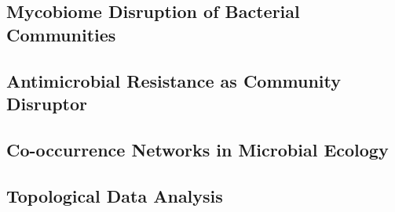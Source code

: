 \subsection{Mycobiome Disruption of Bacterial Communities}
\label{subsec:mycobiome}

\subsection{Antimicrobial Resistance as Community Disruptor}
\label{subsec:amr}

\subsection{Co-occurrence Networks in Microbial Ecology}
\label{subsec:cooccurrence}

\subsection{Topological Data Analysis}
\label{subsec:tda}
